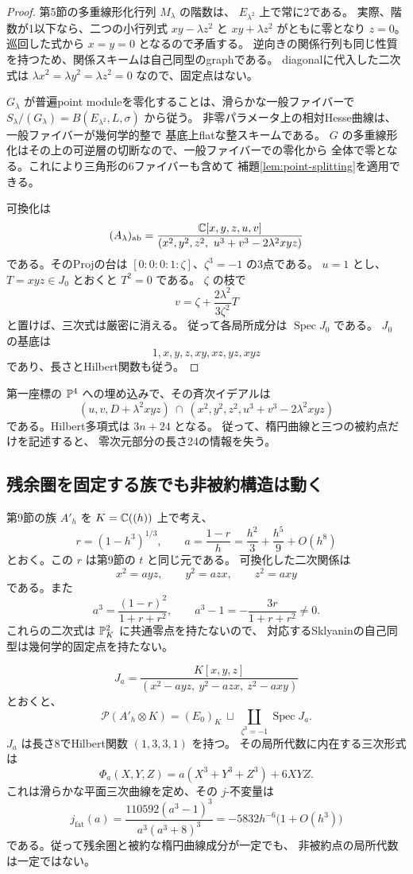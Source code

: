 \begin{proof}
第5節の多重線形化行列 $M_\lambda$ の階数は、
$E_{\lambda^2}$ 上で常に2である。
実際、階数が1以下なら、二つの小行列式
$xy-\lambda z^2$ と $xy+\lambda z^2$ がともに零となり $z=0$。
巡回した式から $x=y=0$ となるので矛盾する。
逆向きの関係行列も同じ性質を持つため、関係スキームは自己同型のgraphである。
diagonalに代入した二次式は
$\lambda x^2=\lambda y^2=\lambda z^2=0$ なので、固定点はない。

$G_\lambda$ が普遍point moduleを零化することは、滑らかな一般ファイバーで
$S_\lambda/(G_\lambda)=B(E_{\lambda^2},L,\sigma)$ から従う。
非零パラメータ上の相対Hesse曲線は、一般ファイバーが幾何学的整で
基底上flatな整スキームである。
$G$ の多重線形化はその上の可逆層の切断なので、一般ファイバーでの零化から
全体で零となる。これにより三角形の6ファイバーも含めて
補題\ref{lem:point-splitting}を適用できる。

可換化は
\[
 (A_\lambda)_{\mathrm{ab}}=
 \frac{\mathbb C[x,y,z,u,v]}
 {(x^2,y^2,z^2,\ u^3+v^3-2\lambda^2xyz)}
\]
である。そのProjの台は $[0:0:0:1:\zeta]$、$\zeta^3=-1$ の3点である。
$u=1$ とし、$T=xyz\in J_0$ とおくと $T^2=0$ である。
$\zeta$ の枝で
\[
 v=\zeta+\frac{2\lambda^2}{3\zeta^2}T
\]
と置けば、三次式は厳密に消える。
従って各局所成分は $\operatorname{Spec}J_0$ である。
$J_0$ の基底は
\[
 1,x,y,z,xy,xz,yz,xyz
\]
であり、長さとHilbert関数も従う。
\end{proof}

第一座標の $\mathbb P^4$ への埋め込みで、その斉次イデアルは
\[
 (u,v,D+\lambda^2xyz)\ \cap\
 (x^2,y^2,z^2,u^3+v^3-2\lambda^2xyz)
\]
である。Hilbert多項式は $3n+24$ となる。
従って、楕円曲線と三つの被約点だけを記述すると、
零次元部分の長さ24の情報を失う。

\subsection{残余圏を固定する族でも非被約構造は動く}

第9節の族 $A'_h$ を $K=\mathbb C((h))$ 上で考え、
\[
 r=(1-h^3)^{1/3},\qquad
 a=\frac{1-r}{h}=\frac{h^2}{3}+\frac{h^5}{9}+O(h^8)
\]
とおく。この $r$ は第9節の $t$ と同じ元である。
可換化した二次関係は
\[
 x^2=a yz,\qquad y^2=a zx,\qquad z^2=a xy
\]
である。また
\[
 a^3=\frac{(1-r)^2}{1+r+r^2},\qquad
 a^3-1=-\frac{3r}{1+r+r^2}\ne0.
\]
これらの二次式は $\mathbb P^2_K$ に共通零点を持たないので、
対応するSklyaninの自己同型は幾何学的固定点を持たない。

\begin{theorem}[固定残余圏族の非被約点]\label{thm:fixed-points}
\[
 J_a=
 \frac{K[x,y,z]}
 {(x^2-a yz,\ y^2-a zx,\ z^2-a xy)}
\]
とおくと、
\[
 \mathscr P(A'_h\otimes K)
 =(E_0)_K\ \sqcup\
 \coprod_{\zeta^3=-1}\operatorname{Spec}J_a.
\]
$J_a$ は長さ8でHilbert関数 $(1,3,3,1)$ を持つ。
その局所代数に内在する三次形式は
\[
 \Phi_a(X,Y,Z)=a(X^3+Y^3+Z^3)+6XYZ.
\]
これは滑らかな平面三次曲線を定め、その $j$-不変量は
\begin{equation}\label{eq:fat-j}
 j_{\mathrm{fat}}(a)
 =\frac{110592(a^3-1)^3}{a^3(a^3+8)^3}
 =-5832h^{-6}\bigl(1+O(h^3)\bigr)
\end{equation}
である。従って残余圏と被約な楕円曲線成分が一定でも、
非被約点の局所代数は一定ではない。
\end{theorem}

